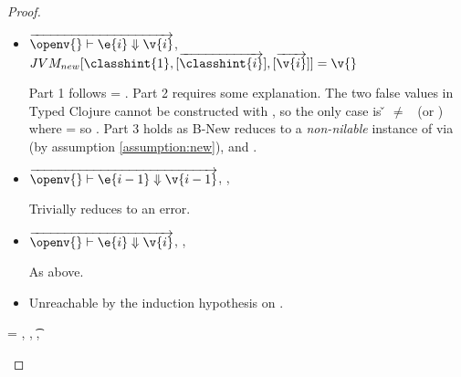 \begin{lemma}
\begin{proof}
\begin{case}[T-NewStatic]
\begin{itemize}
  \item[]
\begin{subcase}[B-New]
  $
  \overrightarrow{
  \opsem {\openv{}}
         {\e{i}}
         {\v{i}}
       }$,
         $\newjava {\classhint{1}}
                  {\overrightarrow{\classhint{i}}}
                  {\overrightarrow{\v{i}}}
                  {\v{}}$

Part 1 follows \object{} = \emptyobject{}.
Part 2 requires some explanation. The two false values in Typed Clojure
cannot be constructed with \newliteral, so the only case is \v{} $\not=$ \false\ (or \nil)
where \thenprop{\prop{}} = \topprop{} so \satisfies{\openv{}}{\thenprop{\prop{}}}.
Part 3 holds as B-New reduces to a \emph{non-nilable}
instance of \class{} via \newjavaliteral (by assumption \ref{assumption:new}), and \javatotc{\classhint{}}{\t{}}.
\end{subcase}
  \item[]

\begin{subcase}[BE-New1] $\overrightarrow{
  \opsem {\openv{}}
         {\e{i-1}}
         {\v{i-1}}
       }$,
  \opsem {\openv{}}
         {}
         {\errorvalv{}},
  \opsem {\openv{}} {\e{}} {\errorvalv{}}

        Trivially reduces to an error.

\end{subcase}
  \item[]

\begin{subcase}[BE-New2] 
  $\overrightarrow{
  \opsem {\openv{}}
         {\e{i}}
         {\v{i}}
       }$,
                  {}
                  {}
                  {\errorvalv{}},
        \opsem {\openv{}} {\e{}} {\errorvalv{}}

        As above.

\end{subcase}
  \item[]

\begin{subcase}[BW-New1]
  Unreachable by the induction hypothesis on {}.
\end{subcase}
\end{itemize}
\end{case}

\begin{case}[T-FieldStatic]
  \e{} = { {} {\fld{}} {}},
   {\class{}},
   {\t{}},
  \judgementtwo {\propenv{}} { {\class{}}}


\end{case}
\end{proof}
\end{lemma}
